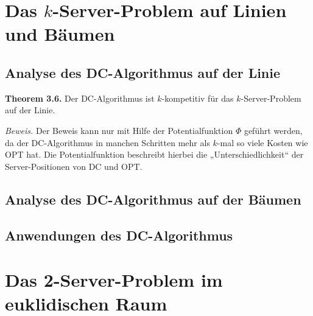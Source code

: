 \section{Das $k$-Server-Problem auf Linien und Bäumen}

\subsection{Analyse des DC-Algorithmus auf der Linie}

\textbf{Theorem 3.6.} Der DC-Algorithmus ist $k$-kompetitiv für das $k$-Server-Problem auf der Linie.

\textit{Beweis.} Der Beweis kann nur mit Hilfe der Potentialfunktion $\Phi$ geführt werden, da der DC-Algorithmus in manchen Schritten mehr als $k$-mal so viele Kosten wie OPT hat. Die Potentialfunktion beschreibt hierbei die „Unterschiedlichkeit“ der Server-Positionen von DC und OPT.


\subsection{Analyse des DC-Algorithmus auf der Bäumen}

\subsection{Anwendungen des DC-Algorithmus}


\section{Das 2-Server-Problem im euklidischen Raum}
